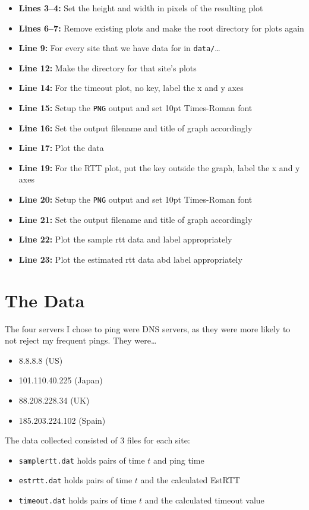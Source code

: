 \documentclass[11pt]{article}
\begin{document}
  \begin{itemize}
    \item \textbf{Lines 3--4:} Set the height and width in pixels of the resulting plot
    \item \textbf{Lines 6--7:} Remove existing plots and make the root directory for plots again
    \item \textbf{Line 9:} For every site that we have data for in \texttt{data/}\dots
    \item \textbf{Line 12:} Make the directory for that site's plots
    \item \textbf{Line 14:} For the timeout plot, no key, label the x and y axes
    \item \textbf{Line 15:} Setup the \texttt{PNG} output and set 10pt Times-Roman font
    \item \textbf{Line 16:} Set the output filename and title of graph accordingly
    \item \textbf{Line 17:} Plot the data
    \item \textbf{Line 19:} For the RTT plot, put the key outside the graph, label the x and y axes
    \item \textbf{Line 20:} Setup the \texttt{PNG} output and set 10pt Times-Roman font
    \item \textbf{Line 21:} Set the output filename and title of graph accordingly
    \item \textbf{Line 22:} Plot the sample rtt data and label appropriately
    \item \textbf{Line 23:} Plot the estimated rtt data abd label appropriately
  \end{itemize}

  \section{The Data}
  The four servers I chose to ping were DNS servers, as they were more likely to not reject 
  my frequent pings. They were\dots
  \begin{itemize}
    \item 8.8.8.8 (US)
    \item 101.110.40.225 (Japan)
    \item 88.208.228.34 (UK)
    \item 185.203.224.102 (Spain)
  \end{itemize}

  The data collected consisted of 3 files for each site:
  \begin{itemize}
    \item \texttt{samplertt.dat} holds pairs of time $t$ and ping time
    \item \texttt{estrtt.dat} holds pairs of time $t$ and the calculated EstRTT
    \item \texttt{timeout.dat} holds pairs of time $t$ and the calculated timeout value
  \end{itemize}
\end{document}
